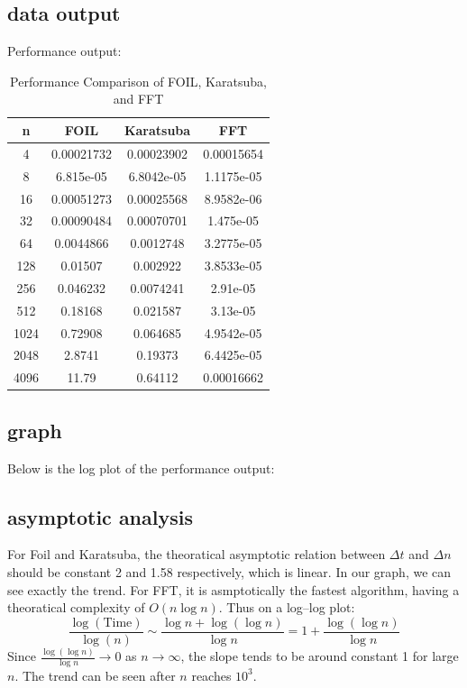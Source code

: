 \documentclass[lang=cn,11pt]{elegantbook}
\begin{document}
\subsection*{data output}
Performance output:
\begin{table}[ht]
\centering
\begin{tabular}{|c|c|c|c|}
\hline
n & FOIL & Karatsuba & FFT \\
\hline
4 & 0.00021732 & 0.00023902 & 0.00015654 \\
8 & 6.815e-05 & 6.8042e-05 & 1.1175e-05 \\
16 & 0.00051273 & 0.00025568 & 8.9582e-06 \\
32 & 0.00090484 & 0.00070701 & 1.475e-05 \\
64 & 0.0044866 & 0.0012748 & 3.2775e-05 \\
128 & 0.01507 & 0.002922 & 3.8533e-05 \\
256 & 0.046232 & 0.0074241 & 2.91e-05 \\
512 & 0.18168 & 0.021587 & 3.13e-05 \\
1024 & 0.72908 & 0.064685 & 4.9542e-05 \\
2048 & 2.8741 & 0.19373 & 6.4425e-05 \\
4096 & 11.79 & 0.64112 & 0.00016662 \\
\hline
\end{tabular}
\caption{Performance Comparison of FOIL, Karatsuba, and FFT}
\end{table}


\subsection*{graph}
Below is the log plot of the performance output:



\subsection*{asymptotic analysis}
For Foil and Karatsuba, the theoratical asymptotic relation between $\Delta t$ and $\Delta n $ should be constant 2 and 1.58 respectively, which is linear. In our graph, we can see exactly the trend. For FFT, it is asmptotically the fastest algorithm, having a theoratical complexity of  \(O(n \log n)\). Thus on a log–log plot:
\[
\frac{\log(\text{Time})}{\log(n)} 
\sim \frac{\log n + \log(\log n)}{\log n} =1 + \frac{\log(\log n)}{\log n}
\]
Since \(\frac{\log(\log n)}{\log n} \to 0\) as \(n \to \infty\), the slope tends to be around constant 1 for large \(n\). The trend can be seen after $n$ reaches $10^3$.
\end{document}

